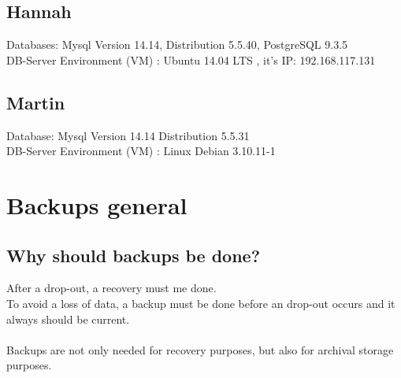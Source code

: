 \documentclass[10pt]{article}
\begin{document}
\subsection{Hannah}
Databases: Mysql Version 14.14, Distribution 5.5.40, PostgreSQL 9.3.5\\
DB-Server Environment (VM) :  Ubuntu 14.04 LTS , it's IP: 192.168.117.131
\subsection{Martin}
Database: Mysql Version 14.14 Distribution 5.5.31\\
DB-Server Environment (VM) : Linux Debian 3.10.11-1
\newpage
\newpage
\section{Backups general}
\subsection{Why should backups be done?}
After a drop-out, a recovery must me done. \\
To avoid a loss of data, a backup must be done before an drop-out occurs and it always should be current. \\ \\
Backups are not only needed for recovery purposes, but also for archival storage purposes.
\end{document}
